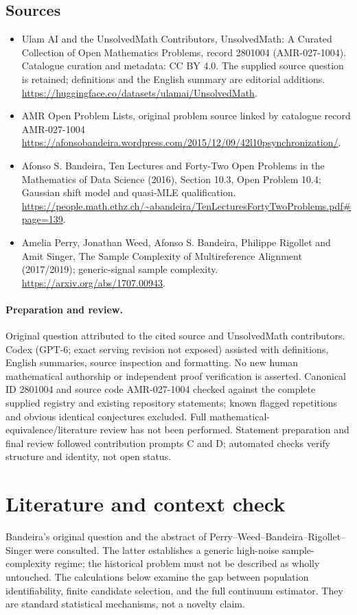 \documentclass[11pt]{article}
\begin{document}
\subsection{Sources}
\begin{itemize}
\item[S1] Ulam AI and the UnsolvedMath Contributors, UnsolvedMath: A Curated Collection of Open Mathematics Problems, record 2801004 (AMR-027-1004). Catalogue curation and metadata: CC BY 4.0. The supplied source question is retained; definitions and the English summary are editorial additions.
\url{https://huggingface.co/datasets/ulamai/UnsolvedMath}.
\item[S2] AMR Open Problem Lists, original problem source linked by catalogue record AMR-027-1004
\url{https://afonsobandeira.wordpress.com/2015/12/09/42l10psynchronization/}.
\item[S3] Afonso S. Bandeira, Ten Lectures and Forty-Two Open Problems in the Mathematics of Data Science (2016), Section 10.3, Open Problem 10.4; Gaussian shift model and quasi-MLE qualification.
\url{https://people.math.ethz.ch/~abandeira/TenLecturesFortyTwoProblems.pdf#page=139}.
\item[S4] Amelia Perry, Jonathan Weed, Afonso S. Bandeira, Philippe Rigollet and Amit Singer, The Sample Complexity of Multireference Alignment (2017/2019); generic-signal sample complexity.
\url{https://arxiv.org/abs/1707.00943}.
\end{itemize}
\paragraph{Preparation and review.}
Original question attributed to the cited source and UnsolvedMath contributors. Codex (GPT-6; exact serving revision not exposed) assisted with definitions, English summaries, source inspection and formatting. No new human mathematical authorship or independent proof verification is asserted. Canonical ID 2801004 and source code AMR-027-1004 checked against the complete supplied registry and existing repository statements; known flagged repetitions and obvious identical conjectures excluded. Full mathematical-equivalence/literature review has not been performed. Statement preparation and final review followed contribution prompts C and D; automated checks verify structure and identity, not open status.
\label{end:2801004}

\section{Literature and context check}
Bandeira's original question and the abstract of Perry--Weed--Bandeira--Rigollet--Singer
were consulted. The latter establishes a generic high-noise sample-complexity
regime; the historical problem must not be described as wholly untouched.
The calculations below examine the gap between population identifiability,
finite candidate selection, and the full continuum estimator. They are standard
statistical mechanisms, not a novelty claim.
\end{document}
